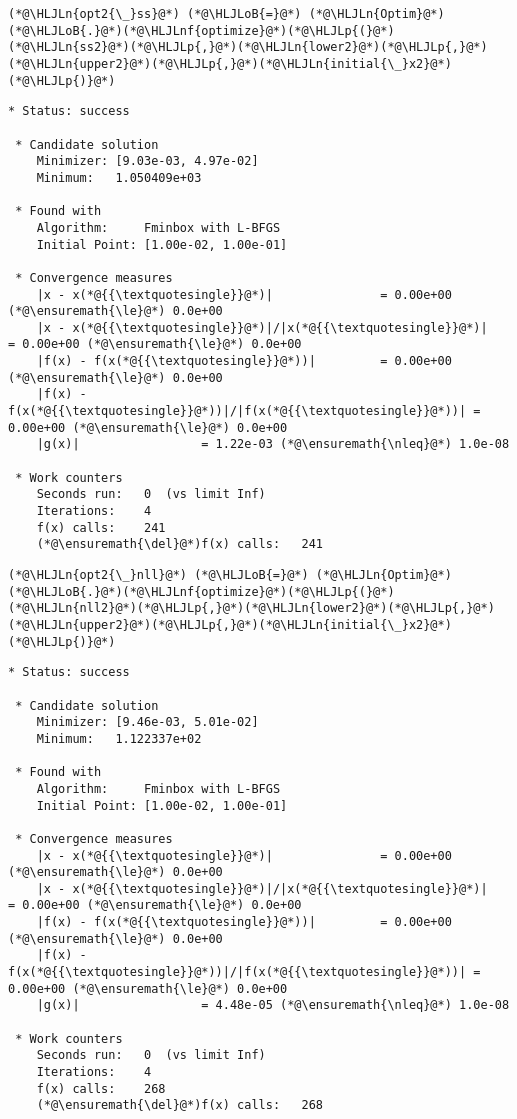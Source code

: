 \documentclass[12pt,a4paper]{article}
\newcommand{\HLJLn}[1]{#1}
\newcommand{\HLJLnf}[1]{\textcolor[RGB]{66,102,213}{#1}}
\newcommand{\HLJLoB}[1]{\textcolor[RGB]{102,102,102}{\textbf{#1}}}
\newcommand{\HLJLp}[1]{#1}
\begin{document}
\begin{lstlisting}
(*@\HLJLn{opt2{\_}ss}@*) (*@\HLJLoB{=}@*) (*@\HLJLn{Optim}@*)(*@\HLJLoB{.}@*)(*@\HLJLnf{optimize}@*)(*@\HLJLp{(}@*)(*@\HLJLn{ss2}@*)(*@\HLJLp{,}@*)(*@\HLJLn{lower2}@*)(*@\HLJLp{,}@*)(*@\HLJLn{upper2}@*)(*@\HLJLp{,}@*)(*@\HLJLn{initial{\_}x2}@*)(*@\HLJLp{)}@*)
\end{lstlisting}

\begin{lstlisting}
* Status: success

 * Candidate solution
    Minimizer: [9.03e-03, 4.97e-02]
    Minimum:   1.050409e+03

 * Found with
    Algorithm:     Fminbox with L-BFGS
    Initial Point: [1.00e-02, 1.00e-01]

 * Convergence measures
    |x - x(*@{{\textquotesingle}}@*)|               = 0.00e+00 (*@\ensuremath{\le}@*) 0.0e+00
    |x - x(*@{{\textquotesingle}}@*)|/|x(*@{{\textquotesingle}}@*)|          = 0.00e+00 (*@\ensuremath{\le}@*) 0.0e+00
    |f(x) - f(x(*@{{\textquotesingle}}@*))|         = 0.00e+00 (*@\ensuremath{\le}@*) 0.0e+00
    |f(x) - f(x(*@{{\textquotesingle}}@*))|/|f(x(*@{{\textquotesingle}}@*))| = 0.00e+00 (*@\ensuremath{\le}@*) 0.0e+00
    |g(x)|                 = 1.22e-03 (*@\ensuremath{\nleq}@*) 1.0e-08

 * Work counters
    Seconds run:   0  (vs limit Inf)
    Iterations:    4
    f(x) calls:    241
    (*@\ensuremath{\del}@*)f(x) calls:   241
\end{lstlisting}


\begin{lstlisting}
(*@\HLJLn{opt2{\_}nll}@*) (*@\HLJLoB{=}@*) (*@\HLJLn{Optim}@*)(*@\HLJLoB{.}@*)(*@\HLJLnf{optimize}@*)(*@\HLJLp{(}@*)(*@\HLJLn{nll2}@*)(*@\HLJLp{,}@*)(*@\HLJLn{lower2}@*)(*@\HLJLp{,}@*)(*@\HLJLn{upper2}@*)(*@\HLJLp{,}@*)(*@\HLJLn{initial{\_}x2}@*)(*@\HLJLp{)}@*)
\end{lstlisting}

\begin{lstlisting}
* Status: success

 * Candidate solution
    Minimizer: [9.46e-03, 5.01e-02]
    Minimum:   1.122337e+02

 * Found with
    Algorithm:     Fminbox with L-BFGS
    Initial Point: [1.00e-02, 1.00e-01]

 * Convergence measures
    |x - x(*@{{\textquotesingle}}@*)|               = 0.00e+00 (*@\ensuremath{\le}@*) 0.0e+00
    |x - x(*@{{\textquotesingle}}@*)|/|x(*@{{\textquotesingle}}@*)|          = 0.00e+00 (*@\ensuremath{\le}@*) 0.0e+00
    |f(x) - f(x(*@{{\textquotesingle}}@*))|         = 0.00e+00 (*@\ensuremath{\le}@*) 0.0e+00
    |f(x) - f(x(*@{{\textquotesingle}}@*))|/|f(x(*@{{\textquotesingle}}@*))| = 0.00e+00 (*@\ensuremath{\le}@*) 0.0e+00
    |g(x)|                 = 4.48e-05 (*@\ensuremath{\nleq}@*) 1.0e-08

 * Work counters
    Seconds run:   0  (vs limit Inf)
    Iterations:    4
    f(x) calls:    268
    (*@\ensuremath{\del}@*)f(x) calls:   268
\end{lstlisting}
\end{document}
